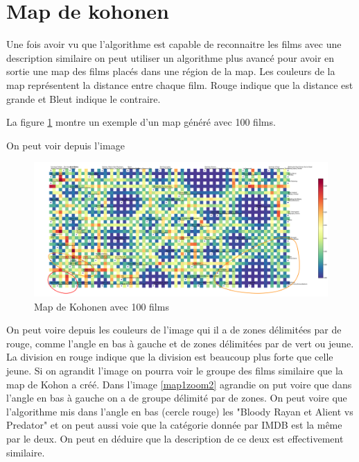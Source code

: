 	\section{Map de kohonen}
	Une fois avoir vu que l'algorithme est capable de reconnaitre les films avec une description similaire on peut utiliser un algorithme plus avancé pour avoir en sortie une map des films placés dans une région de la map. Les couleurs de la map représentent la distance entre chaque film. Rouge indique que la distance est grande et Bleut indique le contraire.
	
	La figure \ref{map1} montre un exemple d'un map généré avec 100 films.
	
	On peut voir depuis l'image
	\begin{figure}[h]
		\centering
		\includegraphics[width=1\linewidth]{img/map-cluster.png}
		\caption{Map de Kohonen avec 100 films}
		\label{map1}
	\end{figure}
	
	On peut voire depuis les couleurs de l'image qui il a de zones délimitées par de rouge, comme l'angle en bas à gauche et de zones délimitées par de vert ou jeune. La division en rouge indique que la division est beaucoup plus forte que celle jeune. Si on agrandit l'image on pourra voir le groupe des films similaire que la map de Kohon a créé.
	Dans l'image \ref{map1zoom2} agrandie on put voire que dans l'angle en bas à gauche on a de groupe délimité par de zones. On peut voire que l'algorithme mis dans l'angle en bas (cercle rouge) les "Bloody Rayan et Alient vs Predator" et on peut aussi voie que la catégorie donnée par IMDB est la même par le deux. On peut en déduire que la description de ce deux est effectivement similaire.
	
